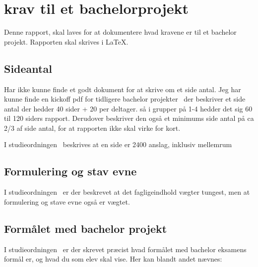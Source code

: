 \documentclass{report}
\begin{document}
\chapter{krav til et bachelorprojekt}
Denne rapport, skal laves for at dokumentere hvad kravene er til et bachelor projekt.
Rapporten skal skrives i \LaTeX.

\section{Sideantal}
Har ikke kunne finde et godt dokument for at skrive om et side antal.
Jeg har kunne finde en kickoff pdf for tidligere bachelor projekter~\cite{kickoff} der beskriver et side antal der hedder 40 sider + 20 per deltager.
så i grupper på 1-4 hedder det sig 60 til 120 siders rapport. Derudover beskriver den også et minimums side antal på ca 2/3 af side antal, for at rapporten ikke skal virke for kort.

I studieordningen~\cite{studie} beskrives at en side er 2400 anslag, inklusiv mellemrum

\section{Formulering og stav evne}
I studieordningen~\cite{studie} er der beskrevet at det fagligeindhold vægter tungest, men at formulering og stave evne også er vægtet.

\section{Formålet med bachelor projekt}
I studieordningen~\cite{studie} er der skrevet præcist hvad formålet med bachelor eksamens formål er, og hvad du som elev skal vise. Her kan blandt andet nævnes:
\end{document}
